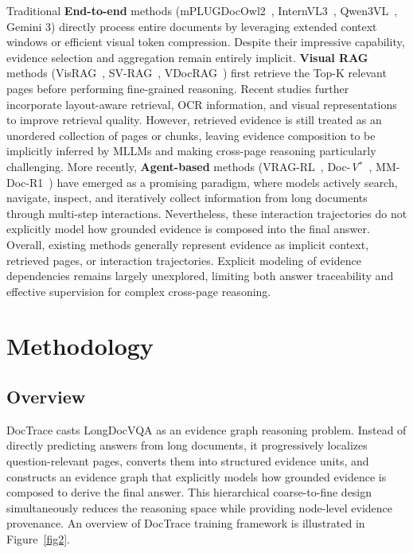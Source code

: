 \documentclass[letterpaper]{article} %
\begin{document}
Traditional  {\bf End-to-end } methods (mPLUGDocOwl2~\cite{hu2025mplug}, InternVL3~\cite{zhu2025internvl3}, Qwen3VL~\cite{bai2025qwen3}, Gemini 3) directly process entire documents by leveraging extended context windows or efficient visual token compression. Despite their impressive capability, evidence selection and aggregation remain entirely implicit. {\bf Visual RAG} methods (VisRAG~\cite{yu2025visrag}, SV-RAG~\cite{chen2024sv}, VDocRAG~\cite{tanaka2025vdocrag}) first retrieve the Top-K relevant pages before performing fine-grained reasoning. Recent studies further incorporate layout-aware retrieval, OCR information, and visual representations to improve retrieval quality. However, retrieved evidence is still treated as an unordered collection of pages or chunks, leaving evidence composition to be implicitly inferred by MLLMs and making cross-page reasoning particularly challenging. More recently, {\bf Agent-based } methods (VRAG-RL~\cite{wang2026vrag},  Doc-{\itshape V}$^{*}$~\cite{zheng2026doc}, MM-Doc-R1~\cite{lin2026mm}) have emerged as a promising paradigm, where models actively search, navigate, inspect, and iteratively collect information from long documents through multi-step interactions. Nevertheless, these interaction trajectories do not explicitly model how grounded evidence is composed into the final answer. Overall, existing methods generally represent evidence as implicit context, retrieved pages, or interaction trajectories. Explicit modeling of evidence dependencies remains largely unexplored, limiting both answer traceability and effective supervision for complex cross-page reasoning.




\section{Methodology}

\subsection{Overview}

DocTrace casts LongDocVQA as an evidence graph reasoning problem. Instead of directly predicting answers from long documents, it progressively localizes question-relevant pages, converts them into structured evidence units, and constructs an evidence graph that explicitly models how grounded evidence is composed to derive the final answer. This hierarchical coarse-to-fine design simultaneously reduces the reasoning space while providing node-level evidence provenance. An overview of DocTrace training framework is illustrated in Figure~\ref{fig2}.
\end{document}
